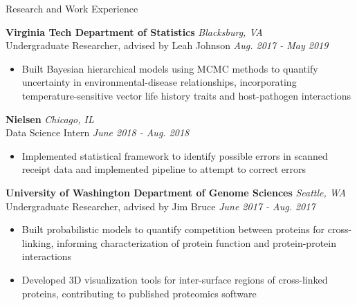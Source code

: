 \documentclass{resume} %
\begin{document}
\begin{rSection}{Research and Work Experience}

{\bf Virginia Tech Department of Statistics} \hfill { \em Blacksburg, VA}\\
{Undergraduate Researcher, advised by Leah Johnson} \hfill {\em Aug. 2017 - May 2019}
\begin{itemize}
    \item Built Bayesian hierarchical models using MCMC methods to quantify uncertainty in environmental-disease relationships, incorporating temperature-sensitive vector life history traits and host-pathogen interactions
\end{itemize}

{\bf Nielsen} \hfill {\em Chicago, IL} \\
{Data Science Intern} \hfill {\em June 2018 - Aug. 2018}
\begin{itemize}
    \item Implemented statistical framework to identify possible errors in scanned receipt data and implemented pipeline to attempt to correct errors
\end{itemize}

{\bf University of Washington Department of Genome Sciences} \hfill { \em Seattle, WA}\\
{Undergraduate Researcher, advised by Jim Bruce} \hfill {\em June 2017 - Aug. 2017}
\begin{itemize}
    \item Built probabilistic models to quantify competition between proteins for cross-linking, informing characterization of protein function and protein-protein interactions
    \item Developed 3D visualization tools for inter-surface regions of cross-linked proteins, contributing to published proteomics software
\end{itemize}

\end{rSection}
\end{document}

